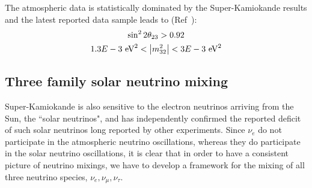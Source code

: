 The atmospheric data is statistically dominated by the Super-Kamiokande results and the latest reported data sample leads to (Ref~):
\begin{equation}
    \begin{gathered}
        \sin^2 2 \theta _{23} > 0.92 \\
    1.3E-3 ~\mathrm{eV}^2 < \abs{m_{32}^2} < 3E-3 ~\mathrm{eV}^2
    \end{gathered}
\end{equation}

\subsection{Three family solar neutrino mixing}
Super-Kamiokande is also sensitive to the electron neutrinos arriving from the Sun, the ``solar neutrinos", and has independently confirmed the reported deficit of such solar neutrinos long reported by other experiments.
Since \(\nu _e\) do not participate in the atmospheric neutrino oscillations, whereas they do participate in the solar neutrino oscillations, it is clear that in order to have a consistent picture of neutrino mixings, we have to develop a framework for the mixing of all three neutrino species, \(\nu _e, \nu _\mu, \nu _\tau \). 

